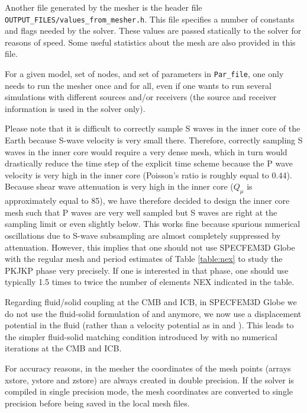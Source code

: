 Another file generated by the mesher is the header file \texttt{OUTPUT\_FILES/values\_from\_mesher.h}.
This file specifies a number of constants and flags needed by the
solver. These values are passed statically to the solver for reasons
of speed. Some useful statistics about the mesh are also provided
in this file.

For a given model, set of nodes, and set of parameters in \texttt{Par\_file},
one only needs to run the mesher once and for all, even if one wants
to run several simulations with different sources and/or receivers
(the source and receiver information is used in the solver only).

Please note that it is difficult to correctly sample S waves in the
inner core of the Earth because S-wave velocity is very small there.
Therefore, correctly sampling S waves in the inner core would require
a very dense mesh, which in turn would drastically reduce the time
step of the explicit time scheme because the P wave velocity is very
high in the inner core (Poisson's ratio is roughly equal to 0.44).
Because shear wave attenuation is very high in the inner core ($Q_{\mu}$
is approximately equal to 85), we have therefore decided to design
the inner core mesh such that P waves are very well sampled but S
waves are right at the sampling limit or even slightly below. This
works fine because spurious numerical oscillations due to S-wave subsampling
are almost completely suppressed by attenuation. However, this implies
that one should not use SPECFEM3D Globe with the regular mesh and
period estimates of Table \ref{table:nex} to study the PKJKP phase
very precisely. If one is interested in that phase, one should use
typically 1.5 times to twice the number of elements NEX indicated
in the table.

Regarding fluid/solid coupling at the CMB and ICB, in SPECFEM3D Globe
we do not use the fluid-solid formulation of \citet{KoTr02a} and
\citet{KoTr02b} anymore, we now use a displacement potential in the
fluid (rather than a velocity potential as in \citet{KoTr02a} and
\citet{KoTr02b}). This leads to the simpler fluid-solid matching
condition introduced by \citet{ChVa04} with no numerical iterations
at the CMB and ICB.

For accuracy reasons, in the mesher the coordinates of the mesh points
(arrays xstore, ystore and zstore) are always created in double precision.
If the solver is compiled in single precision mode, the mesh coordinates
are converted to single precision before being saved in the local
mesh files.


